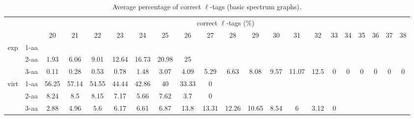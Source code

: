 \documentclass{article}
\begin{document}
\begin{table}[h]\tiny
\vspace{3mm}
{\centering
\begin{center}
\begin{tabular}{|c|l|c|c|c|c|c|c|c|c|c|c|c|c|c|c|c|c|c|c|c|}
  \hline
  \multicolumn{2}{|c|}{ } & \multicolumn{ 19 }{|c|}{ correct $\ell$-tags (\%)} \\
  \cline{3- 21}
  \multicolumn{2}{|c|}{ }  & 20 & 21 & 22 & 23 & 24 & 25 & 26 & 27 & 28 & 29 & 30 & 31 & 32 & 33 & 34 & 35 & 36 & 37 & 38\\
  \hline
  \multirow{3}{*}{exp}
&  1-aa  &  &  &  &  &  &  &  &  &  &  &  &  &  &  &  &  &  &  & \\&  2-aa  & 1.93 & 6.06 & 9.01 & 12.64 & 16.73 & 20.98 & 25 &  &  &  &  &  &  &  &  &  &  &  & \\&  3-aa  & 0.11 & 0.28 & 0.53 & 0.78 & 1.48 & 3.07 & 4.09 & 5.29 & 6.63 & 8.08 & 9.57 & 11.07 & 12.5 & 0 & 0 & 0 & 0 & 0 & 0\\ \hline
  \multirow{3}{*}{virt} 
&  1-aa  & 56.25 & 57.14 & 54.55 & 44.44 & 42.86 & 40 & 33.33 & 0 &  &  &  &  &  &  &  &  &  &  & \\&  2-aa  & 8.24 & 8.5 & 8.15 & 7.17 & 5.66 & 7.62 & 3.7 & 0 &  &  &  &  &  &  &  &  &  &  & \\&  3-aa  & 2.88 & 4.96 & 5.6 & 6.17 & 6.61 & 6.87 & 13.8 & 13.31 & 12.26 & 10.65 & 8.54 & 6 & 3.12 & 0 &  &  &  &  & \\ \hline
\end{tabular}
\end{center}
\par}
\centering
\caption{ Average percentage of correct $\ell$-tags (basic spectrum graphs).}
\vspace{3mm}
\label{table:table1}
\end{table}
\end{document}
